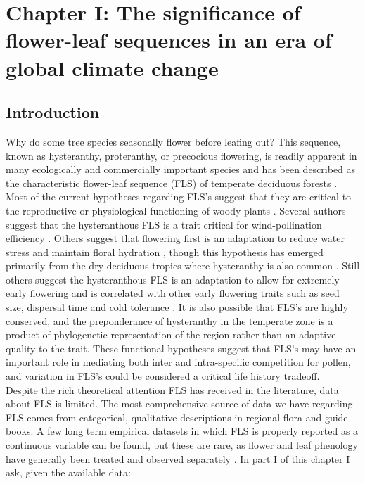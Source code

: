 \documentclass[12pt]{article}\usepackage[]{graphicx}\usepackage[]{color}
\begin{document}
\section*{Chapter I: The significance of flower-leaf sequences in an era of global climate change}
\subsection*{Introduction}
\indent\indent Why do some tree species seasonally flower before leafing out? This sequence, known as hysteranthy, proteranthy, or precocious flowering, is readily apparent in many ecologically and commercially important species and has been described as  the characteristic flower-leaf sequence (FLS) of temperate deciduous forests \citep{Rathcke1985}. Most of the current hypotheses regarding FLS's suggest that they are critical to the reproductive or physiological functioning of woody plants \citep{Gougherty2018}. Several authors suggest that the hysteranthous FLS is a trait critical for wind-pollination efficiency \citep{Whitehead1969,Friedman2009}. Others suggest that flowering first is an adaptation to reduce water stress and maintain floral hydration \citep{Franklin2016}, though this hypothesis has emerged primarily from the dry-deciduous tropics where hysteranthy is also common \citep{Janzen1967,Franklin2016}.  Still others suggest the hysteranthous FLS is an adaptation to allow for extremely early flowering and is correlated with other early flowering traits such as seed size, dispersal time and cold tolerance \citep{Gougherty2018,Bolmgren2003,Primack1987}. It is also possible that FLS's are highly conserved, and the preponderance of hysteranthy in the temperate zone is a product of phylogenetic representation of the region rather than an adaptive quality to the trait. These functional hypotheses suggest that FLS's may have an important role in mediating both inter and intra-specific competition for pollen, and variation in FLS's could be considered a critical life history tradeoff. \\
\indent Despite the rich theoretical attention FLS has received in the literature, data about FLS is limited. The most comprehensive source of data we have regarding FLS comes from categorical, qualitative descriptions in regional flora and guide books. A few long term empirical datasets in which FLS is properly reported as a continuous variable can be found, but these are rare, as flower and leaf phenology have generally been treated and observed separately \citep{Wolkovich2014}. In part I of this chapter I ask, given the available data:
\end{document}
